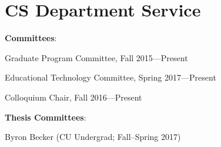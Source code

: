 \documentclass[10pt,letterpaper]{article}
\newcommand{\ReviewItem}[1]{\item #1}
\newcommand{\ReviewItemsBegin}{\begin{itemize}}
\newcommand{\ReviewItemsEnd}{\end{itemize}}
\renewenvironment{itemize}{
  \begin{list}{}{
    \setlength{\leftmargin}{1.5em}
    \setlength{\itemsep}{0.25em}
    \setlength{\parskip}{0pt}
    \setlength{\parsep}{0.25em}
  }
}{
  \end{list}
}
\begin{document}
\section*{CS Department Service}

\begin{itemize}

\item \textbf{Committees}:
\ReviewItemsBegin
\ReviewItem{ Graduate Program Committee, Fall 2015---Present}
\ReviewItem{ Educational Technology Committee, Spring 2017---Present}
\ReviewItemsEnd

\item Colloquium Chair, Fall 2016---Present

\item \textbf{Thesis Committees}:
\ReviewItemsBegin
\ReviewItem{ Byron Becker (CU Undergrad; Fall--Spring 2017) }
\ReviewItemsEnd

\end{itemize}
\end{document}
